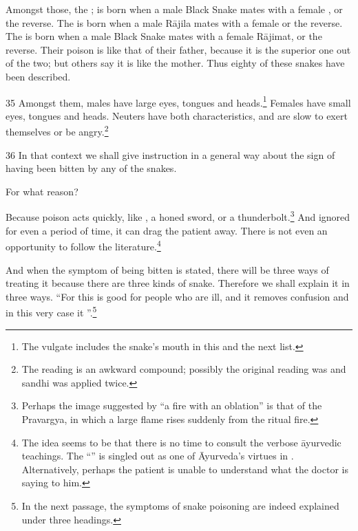 \begin{translation}
Amongst those, the ;  is born when a male Black Snake
mates with a female , or the reverse.  The
 is born when a male Rājila mates with a female
 or the reverse.  The 
is born when a male Black Snake mates with a female Rājimat, or the
reverse. Their poison is like that of their father, because it is the
superior one out of the two; but others say it is like the mother.   Thus
eighty of these snakes have been described.


\item[35]
Amongst them, males have large eyes, tongues and heads.\footnote{The 
vulgate includes the snake's mouth in this and the next list.}  Females have 
small 
eyes, tongues and heads. Neuters have both characteristics, and are slow to 
exert themselves or be angry.\footnote{The reading  
is an awkward compound; possibly the original reading was  and sandhi was applied twice.}

\item[36] In that context we shall give instruction in a general way
about the sign of having been bitten by any of the 
snakes.

For what reason? 

Because poison acts quickly, like , a honed
sword, or a thunderbolt.\footnote{Perhaps the image suggested by “a fire
    with an oblation” is that of the Pravargya, in which a large flame rises
    suddenly from the ritual fire.}  And ignored for even a period of time,
    it can drag the patient away. There is not even an opportunity to follow
    the literature.\footnote{The idea seems to be that there is no time to
        consult the verbose āyurvedic teachings.  The
        “” is
        singled out as one of Āyurveda's virtues in .
        Alternatively, perhaps the patient is unable to understand what the
        doctor is saying to him.} 

        And when the symptom of being bitten is stated, there will be three
        ways of treating it because there are three kinds of snake. Therefore
        we shall explain it in three ways. “For this is good for people who are ill,
        and it removes confusion and in this very case it ”.\footnote{In the next passage, the symptoms of snake 
        poisoning are indeed explained under three headings.}


\end{translation}
